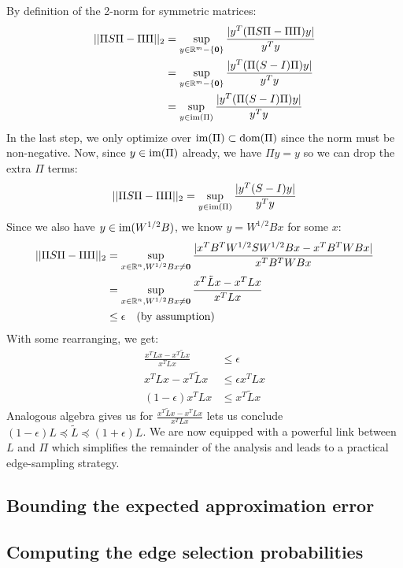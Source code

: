 \documentclass{article}
\begin{document}
\noindent
By definition of the 2-norm for symmetric matrices:
\begin{align*}
    ||\Pi S\Pi - \Pi\Pi||_2 &= \sup_{y \in \mathbb{R}^m - \{\mathbf{0}\}} \frac{|y^T(\Pi
    S\Pi - \Pi\Pi)y|}{y^Ty} \\
                            &= \sup_{y \in \mathbb{R}^m - \{\mathbf{0}\}} \frac{|y^T(\Pi
    (S - I)\Pi)y|}{y^Ty} \\
                            &= \sup_{y \in \text{im}(\Pi)} \frac{|y^T(\Pi
    (S - I)\Pi)y|}{y^Ty}
\end{align*}
In the last step, we only optimize over $\text{im}(\Pi) \subset \text{dom}(\Pi)$
since the norm must be non-negative. Now, since $y \in \text{im}(\Pi)$ already, we
have $\Pi y = y$ so we can drop the extra $\Pi$ terms:
\begin{align*}
    ||\Pi S\Pi - \Pi\Pi||_2 = \sup_{y \in \text{im}(\Pi)} \frac{|y^T(S -
    I)y|}{y^Ty}
\end{align*}
Since we also have $y \in \text{im}(W^{1/2}B)$, we know $y = W^{1/2}Bx$ for some
$x$:
\begin{align*}
    ||\Pi S\Pi - \Pi\Pi||_2 &= \sup_{x \in \mathbb{R}^n, W^{1/2}Bx \not= \mathbf{0}}
    \frac{|x^TB^TW^{1/2}SW^{1/2}Bx - x^TB^TWBx|}{x^TB^TWBx} \\
    &= \sup_{x \in \mathbb{R}^n, W^{1/2}Bx \not= \mathbf{0}} \frac{x^T\tilde{L}x -
x^TLx}{x^TLx} \\
    &\leq \epsilon \quad \text{(by assumption)}
\end{align*}
With some rearranging, we get:
\begin{align*}
    \frac{x^TLx - x^T\tilde{L}x}{x^TLx} &\leq \epsilon \\
    x^TLx - x^T\tilde{L}x &\leq \epsilon x^TLx \\
    (1 - \epsilon)x^TLx &\leq x^T\tilde{L}x
\end{align*}
Analogous algebra gives us for $\frac{x^T\tilde{L}x - x^TLx}{x^TLx}$ lets us
conclude $(1-\epsilon)L \preceq \tilde{L} \preceq (1+\epsilon)L$. We are now
equipped with a powerful link between $L$ and $\Pi$ which simplifies the
remainder of the analysis and leads to a practical edge-sampling strategy.

\subsection{Bounding the expected approximation error}

\subsection{Computing the edge selection probabilities}
\end{document}
